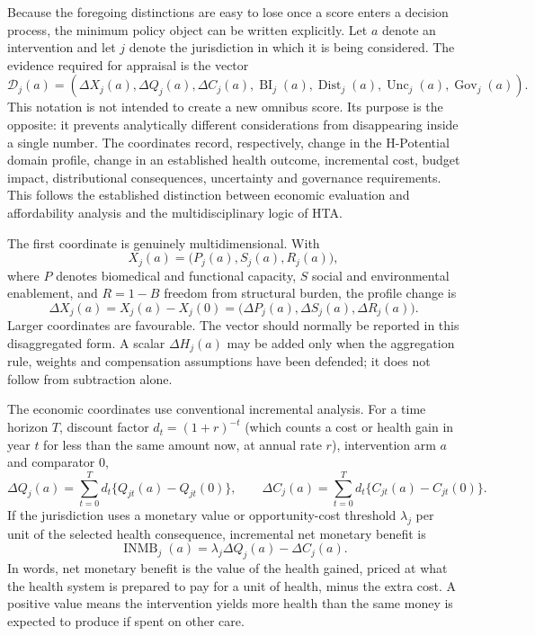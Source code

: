 Because the foregoing distinctions are easy to lose once a score enters a
decision process, the minimum policy object can be written explicitly. Let
$a$ denote an intervention and let $j$ denote the jurisdiction in which it is
being considered. The evidence required for appraisal is the vector
\[
\mathcal D_j(a)=
\left(
\Delta X_j(a),\Delta Q_j(a),\Delta C_j(a),
\operatorname{BI}_j(a),\operatorname{Dist}_j(a),
\operatorname{Unc}_j(a),\operatorname{Gov}_j(a)
\right).
\]
This notation is not intended to create a new omnibus score. Its purpose is the
opposite: it prevents analytically different considerations from disappearing
inside a single number. The coordinates record, respectively, change in the
H-Potential domain profile, change in an established health outcome,
incremental cost, budget impact, distributional consequences, uncertainty and
governance requirements. This follows the established distinction between
economic evaluation and affordability analysis and the multidisciplinary logic
of HTA. \citep{drummond2015,who_hta_2014,who_hta_institutional_2021}

The first coordinate is genuinely multidimensional. With
\[
X_j(a)=\bigl(P_j(a),S_j(a),R_j(a)\bigr),
\]
where $P$ denotes biomedical and functional capacity, $S$ social and
environmental enablement, and $R=1-B$ freedom from structural burden, the
profile change is
\[
\Delta X_j(a)=X_j(a)-X_j(0)
=\bigl(\Delta P_j(a),\Delta S_j(a),\Delta R_j(a)\bigr).
\]
Larger coordinates are favourable. The vector should normally be reported in
this disaggregated form. A scalar $\Delta H_j(a)$ may be added only when the
aggregation rule, weights and compensation assumptions have been defended; it
does not follow from subtraction alone.

The economic coordinates use conventional incremental analysis. For a time
horizon $T$, discount factor $d_t=(1+r)^{-t}$ (which counts a cost or health gain in year $t$ for less than the same amount now, at annual rate $r$), intervention arm $a$ and
comparator $0$,
\[
\Delta Q_j(a)=\sum_{t=0}^{T}d_t
  \{Q_{jt}(a)-Q_{jt}(0)\},
\qquad
\Delta C_j(a)=\sum_{t=0}^{T}d_t
  \{C_{jt}(a)-C_{jt}(0)\}.
\]
If the jurisdiction uses a monetary value or opportunity-cost threshold
$\lambda_j$ per unit of the selected health consequence, incremental net
monetary benefit is \citep{stinnett_mullahy_1998}
\[
\operatorname{INMB}_j(a)=
\lambda_j\Delta Q_j(a)-\Delta C_j(a).
\]
In words, net monetary benefit is the value of the health gained, priced at what the health system is prepared to pay for a unit of health, minus the extra cost. A positive value means the intervention yields more health than the same money is expected to produce if spent on other care.

